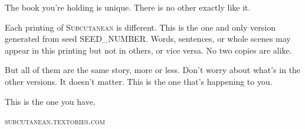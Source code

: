 \begin{adjustwidth}{4em}{4em}
\begin{parascale}[0.88]
The book you're holding is unique. There is no other exactly like it.

Each printing of \textsc{Subcutanean} is different. This is the one and only version generated from seed SEED_NUMBER. Words, sentences, or whole scenes may appear in this printing but not in others, or vice versa. No two copies are alike.

But all of them are the same story, more or less. Don't worry about what's in the other versions. It doesn't matter. This is the one that's happening to you.

This is the one you have.  
\end{parascale}
\end{adjustwidth}

\vspace*{2\nbs}

\begin{center}
\textsc{subcutanean.textories.com}
\end{center}

\clearpage


